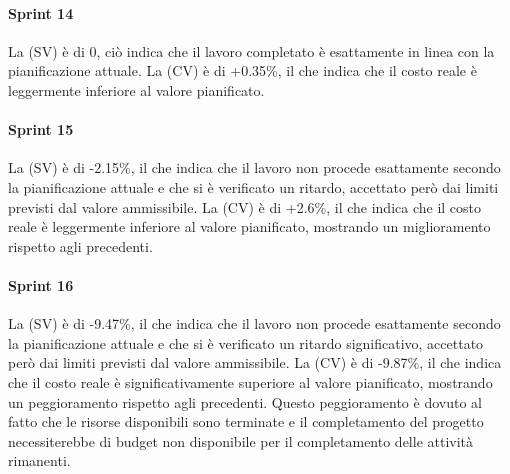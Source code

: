 \paragraph{Sprint 14}
La  (SV) è di 0, ciò indica che il lavoro completato è esattamente in linea con la pianificazione attuale.
La  (CV) è di +0.35\%, il che indica che il costo reale è leggermente inferiore al valore pianificato.

\paragraph{Sprint 15}
La  (SV) è di -2.15\%, il che indica che il lavoro non procede esattamente secondo la pianificazione attuale e che si è verificato un ritardo, accettato però dai limiti previsti dal valore ammissibile.
La  (CV) è di +2.6\%, il che indica che il costo reale è leggermente inferiore al valore pianificato, mostrando un miglioramento rispetto agli  precedenti.

\paragraph{Sprint 16}
La  (SV) è di -9.47\%, il che indica che il lavoro non procede esattamente secondo la pianificazione attuale e che si è verificato un ritardo significativo, accettato però dai limiti previsti dal valore ammissibile.
La  (CV) è di -9.87\%, il che indica che il costo reale è significativamente superiore al valore pianificato, mostrando un peggioramento rispetto agli  precedenti.
Questo peggioramento è dovuto al fatto che le risorse disponibili sono terminate e il completamento del progetto necessiterebbe di budget non disponibile per il completamento delle attività rimanenti.